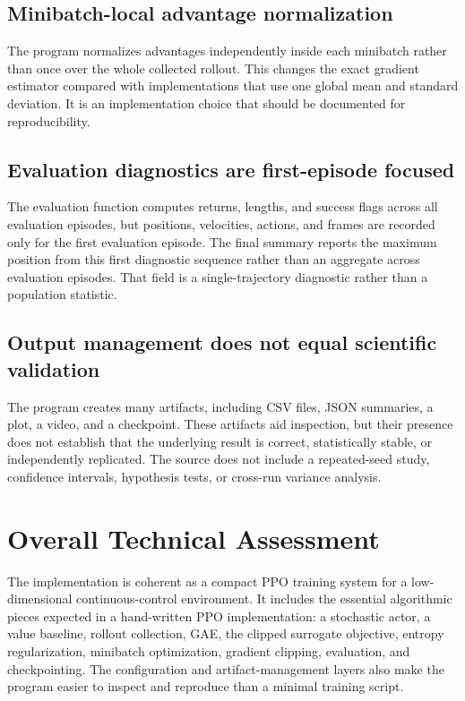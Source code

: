 \documentclass[11pt,a4paper]{article}
\begin{document}
\subsection{Minibatch-local advantage normalization}
The program normalizes advantages independently inside each minibatch rather than once over the whole collected rollout. This changes the exact gradient estimator compared with implementations that use one global mean and standard deviation. It is an implementation choice that should be documented for reproducibility.

\subsection{Evaluation diagnostics are first-episode focused}
The evaluation function computes returns, lengths, and success flags across all evaluation episodes, but positions, velocities, actions, and frames are recorded only for the first evaluation episode. The final summary reports the maximum position from this first diagnostic sequence rather than an aggregate across evaluation episodes. That field is a single-trajectory diagnostic rather than a population statistic.

\subsection{Output management does not equal scientific validation}
The program creates many artifacts, including CSV files, JSON summaries, a plot, a video, and a checkpoint. These artifacts aid inspection, but their presence does not establish that the underlying result is correct, statistically stable, or independently replicated. The source does not include a repeated-seed study, confidence intervals, hypothesis tests, or cross-run variance analysis.

\section{Overall Technical Assessment}
The implementation is coherent as a compact PPO training system for a low-dimensional continuous-control environment. It includes the essential algorithmic pieces expected in a hand-written PPO implementation: a stochastic actor, a value baseline, rollout collection, GAE, the clipped surrogate objective, entropy regularization, minibatch optimization, gradient clipping, evaluation, and checkpointing. The configuration and artifact-management layers also make the program easier to inspect and reproduce than a minimal training script.
\end{document}
